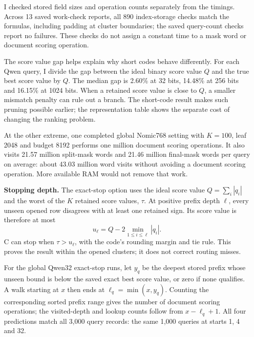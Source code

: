 \label{sec:prefix-check}
I checked stored field sizes and operation counts separately from the timings. Across 13 saved work-check reports, all 890 index-storage checks match the formulas, including padding at cluster boundaries; the saved query-count checks report no failures. These checks do not assign a constant time to a mask word or document scoring operation.

The score value gap helps explain why short codes behave differently. For each Qwen query, I divide the gap between the ideal binary score value $Q$ and the true best score value by $Q$. The median gap is 2.60\% at 32 bits, 14.48\% at 256 bits and 16.15\% at 1024 bits. When a retained score value is close to $Q$, a smaller mismatch penalty can rule out a branch. The short-code result makes such pruning possible earlier; the representation table shows the separate cost of changing the ranking problem.

At the other extreme, one completed global Nomic768 setting with $K=100$, leaf 2048 and budget 8192 performs one million document scoring operations. It also visits 21.57 million split-mask words and 21.46 million final-mask words per query on average: about 43.03 million word visits without avoiding a document scoring operation. More available RAM would not remove that work.

\textbf{Stopping depth.}
The exact-stop option uses the ideal score value $Q=\sum_i|q_i|$ and the worst of the $K$ retained score values, $\tau$. At positive prefix depth $\ell$, every unseen opened row disagrees with at least one retained sign. Its score value is therefore at most
\[
 u_\ell=Q-2\min_{1\le i\le\ell}|q_i|.
\]
C can stop when $\tau>u_\ell$, with the code's rounding margin and tie rule. This proves the result within the opened clusters; it does not correct routing misses.

For the global Qwen32 exact-stop runs, let $y_q$ be the deepest stored prefix whose unseen bound is below the saved exact best score value, or zero if none qualifies. A walk starting at $x$ then ends at $\ell_q=\min(x,y_q)$. Counting the corresponding sorted prefix range gives the number of document scoring operations; the visited-depth and lookup counts follow from $x-\ell_q+1$. All four predictions match all 3,000 query records: the same 1,000 queries at starts 1, 4 and 32.

